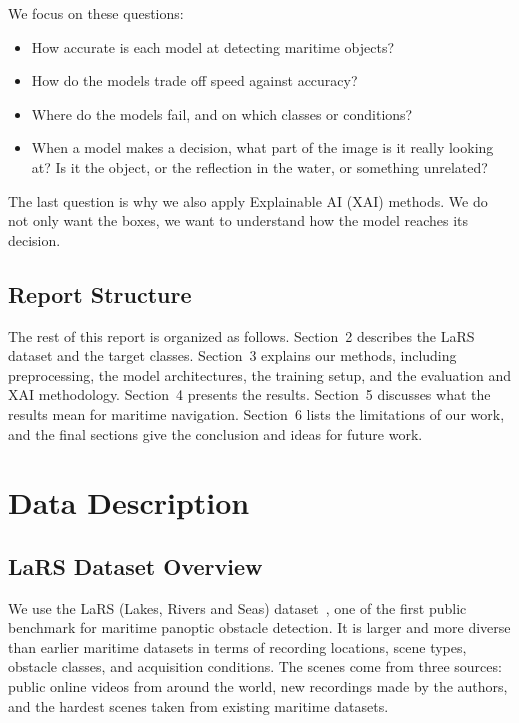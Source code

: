 \documentclass[11pt,a4paper]{article}
\begin{document}
We focus on these questions:
\begin{itemize}[noitemsep]
    \item How accurate is each model at detecting maritime objects?
    \item How do the models trade off speed against accuracy?
    \item Where do the models fail, and on which classes or conditions?
    \item When a model makes a decision, what part of the image is it really
          looking at? Is it the object, or the reflection in the water, or something unrelated?
\end{itemize}
The last question is why we also apply Explainable AI (XAI) methods. We do not only want the boxes, we want to understand how the model reaches its decision.

\subsection{Report Structure}
The rest of this report is organized as follows. Section~2 describes the LaRS
dataset and the target classes. Section~3 explains our methods, including
preprocessing, the model architectures, the training setup, and the evaluation
and XAI methodology. Section~4 presents the results. Section~5 discusses what
the results mean for maritime navigation. Section~6 lists the limitations of our
work, and the final sections give the conclusion and ideas for future work.

\section{Data Description}

\subsection{LaRS Dataset Overview}
We use the LaRS (Lakes, Rivers and Seas) dataset~\cite{zust2023lars}, one of the first public benchmark for maritime panoptic obstacle detection. It is larger and more diverse than earlier maritime datasets in terms of recording locations, scene types, obstacle classes, and acquisition conditions. The scenes come from three sources: public online videos from around the world, new recordings made by the authors, and the hardest scenes taken from existing maritime datasets.
\end{document}
